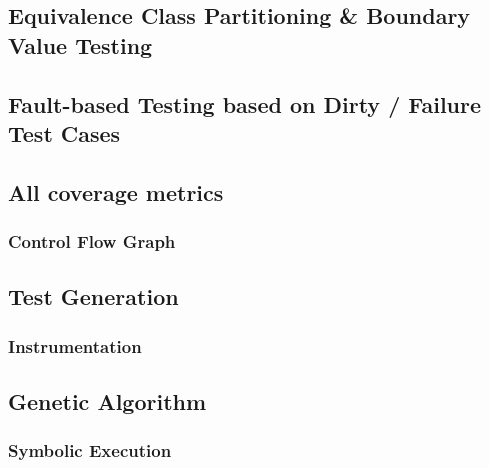 \documentclass[a4paper]{article}
\begin{document}
\subsection{Equivalence Class Partitioning \& Boundary Value Testing}
\subsection{Fault-based Testing based on Dirty / Failure Test Cases}
\subsection{All coverage metrics}
\subsubsection{Control Flow Graph}
\subsection{Test Generation}
\subsubsection{Instrumentation}
\subsection{Genetic Algorithm}
\subsubsection{Symbolic Execution}
\end{document}
